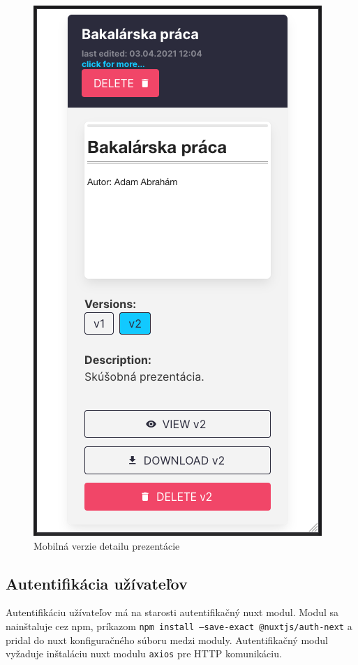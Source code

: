 \begin{figure}[!hbt]
\begin{minipage}{.5\textwidth}
  \includegraphics[scale=0.2]{obrazky/mobil_detail.png}
  \caption{Mobilná verzie detailu prezentácie}
  \label{pic:mobil_detail}
\end{minipage}
\end{figure}

\subsection{Autentifikácia užívateľov}
Autentifikáciu užívateľov má na starosti autentifikačný nuxt modul. Modul sa nainštaluje cez npm, príkazom \texttt{npm install --save-exact @nuxtjs/auth-next} a pridal do nuxt konfiguračného súboru medzi moduly. Autentifikačný modul vyžaduje inštaláciu nuxt modulu \texttt{axios} pre HTTP komunikáciu. 

